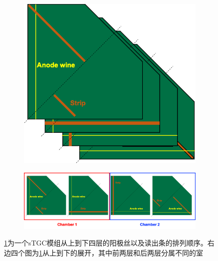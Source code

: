\begin{figure}[htb]
    \centering
    \begin{subfigure}[b]{0.3\textwidth}
        \centering
        \includegraphics[width=\textwidth,clip]{figures/Chapter3/sTGC_Layers.png}
        \caption{}
        \label{fig:sTGC_Layers}
    \end{subfigure}
    \hfill
    \begin{subfigure}[b]{0.65\textwidth}
        \centering
        \includegraphics[width=\textwidth,clip]{figures/Chapter3/sTGC_chamber.png}
        \caption{}
        \label{fig:sTGC_chamber}
    \end{subfigure}
    \caption[sTGC 模组结构示意图]{\ref{fig:sTGC_Layers}为一个sTGC模组从上到下四层的阳极丝以及读出条的排列顺序。右边四个图为\ref{fig:sTGC_Layers}从上到下的展开，其中前两层和后两层分属不同的室}
       \label{fig:sTGC_All_Layers}
\end{figure}

